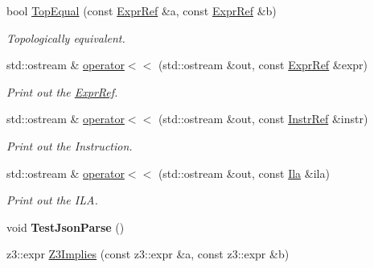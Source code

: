 \begin{DoxyCompactItemize}
\mbox{\label{namespaceilang_aafc42fabe7c53eadf8db66da979cd156}} 
bool \mbox{\hyperlink{namespaceilang_aafc42fabe7c53eadf8db66da979cd156}{Top\+Equal}} (const \mbox{\hyperlink{classilang_1_1_expr_ref}{Expr\+Ref}} \&a, const \mbox{\hyperlink{classilang_1_1_expr_ref}{Expr\+Ref}} \&b)
\begin{DoxyCompactList}\small\item\em Topologically equivalent. \end{DoxyCompactList}\item 
\mbox{\label{namespaceilang_ab9bcc3ec35bb95561155203ab61e2e0d}} 
std\+::ostream \& \mbox{\hyperlink{namespaceilang_ab9bcc3ec35bb95561155203ab61e2e0d}{operator$<$$<$}} (std\+::ostream \&out, const \mbox{\hyperlink{classilang_1_1_expr_ref}{Expr\+Ref}} \&expr)
\begin{DoxyCompactList}\small\item\em Print out the \mbox{\hyperlink{classilang_1_1_expr_ref}{Expr\+Ref}}. \end{DoxyCompactList}\item 
\mbox{\label{namespaceilang_a36a7e5decaea56c186a7576ddf30379b}} 
std\+::ostream \& \mbox{\hyperlink{namespaceilang_a36a7e5decaea56c186a7576ddf30379b}{operator$<$$<$}} (std\+::ostream \&out, const \mbox{\hyperlink{classilang_1_1_instr_ref}{Instr\+Ref}} \&instr)
\begin{DoxyCompactList}\small\item\em Print out the Instruction. \end{DoxyCompactList}\item 
\mbox{\label{namespaceilang_a6a1bf9ab1a26dcdd7ac71b99181c96ac}} 
std\+::ostream \& \mbox{\hyperlink{namespaceilang_a6a1bf9ab1a26dcdd7ac71b99181c96ac}{operator$<$$<$}} (std\+::ostream \&out, const \mbox{\hyperlink{classilang_1_1_ila}{Ila}} \&ila)
\begin{DoxyCompactList}\small\item\em Print out the I\+LA. \end{DoxyCompactList}\item 
\mbox{\label{namespaceilang_a71519439e68ee7fa1eac03efd983a75d}} 
void {\bfseries Test\+Json\+Parse} ()
\item 
z3\+::expr \mbox{\hyperlink{namespaceilang_a75f0dd2c19f74d7e96efc740fba76c6a}{Z3\+Implies}} (const z3\+::expr \&a, const z3\+::expr \&b)

\end{DoxyCompactItemize}
